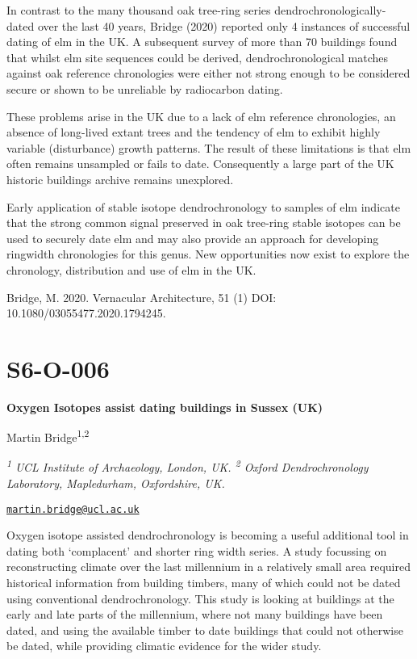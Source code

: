 \documentclass[
]{book}
\begin{document}
In contrast to the many thousand oak tree-ring series dendrochronologically-dated over the last 40 years, Bridge (2020) reported only 4 instances of successful dating of elm in the UK. A subsequent survey of more than 70 buildings found that whilst elm site sequences could be derived, dendrochronological matches against oak reference chronologies were either not strong enough to be considered secure or shown to be unreliable by radiocarbon dating.

These problems arise in the UK due to a lack of elm reference chronologies, an absence of long-lived extant trees and the tendency of elm to exhibit highly variable (disturbance) growth patterns. The result of these limitations is that elm often remains unsampled or fails to date. Consequently a large part of the UK historic buildings archive remains unexplored.

Early application of stable isotope dendrochronology to samples of elm indicate that the strong common signal preserved in oak tree-ring stable isotopes can be used to securely date elm and may also provide an approach for developing ringwidth chronologies for this genus. New opportunities now exist to explore the chronology, distribution and use of elm in the UK.

Bridge, M. 2020. Vernacular Architecture, 51 (1) DOI: 10.1080/03055477.2020.1794245.

\hypertarget{s6-o-006}{%
\section*{S6-O-006}\label{s6-o-006}}

\textbf{Oxygen Isotopes assist dating buildings in Sussex (UK)}

Martin Bridge\textsuperscript{1,2}

\emph{\textsuperscript{1} UCL Institute of Archaeology, London, UK. \textsuperscript{2} Oxford Dendrochronology Laboratory, Mapledurham, Oxfordshire, UK.}

\href{mailto:martin.bridge@ucl.ac.uk}{\nolinkurl{martin.bridge@ucl.ac.uk}}

Oxygen isotope assisted dendrochronology is becoming a useful additional tool in dating both `complacent' and shorter ring width series. A study focussing on reconstructing climate over the last millennium in a relatively small area required historical information from building timbers, many of which could not be dated using conventional dendrochronology. This study is looking at buildings at the early and late parts of the millennium, where not many buildings have been dated, and using the available timber to date buildings that could not otherwise be dated, while providing climatic evidence for the wider study.
\end{document}
